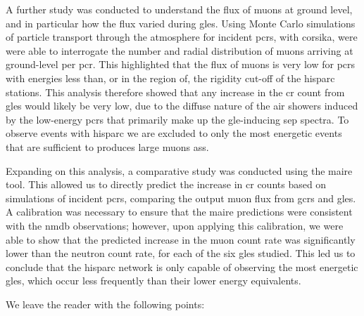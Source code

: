 A further study was conducted to understand the flux of muons at ground level, and in particular how the flux varied during \glspl{gle}. Using Monte Carlo simulations of particle transport through the atmosphere for incident \glspl{pcr}, with \gls{corsika}, were were able to interrogate the number and radial distribution of muons arriving at ground-level per \gls{pcr}. This highlighted that the flux of muons is very low for \glspl{pcr} with energies less than, or in the region of, the rigidity cut-off of the \gls{hisparc} stations. This analysis therefore showed that any increase in the \gls{cr} count from \glspl{gle} would likely be very low, due to the diffuse nature of the air showers induced by the low-energy \glspl{pcr} that primarily make up the \gls{gle}-inducing \gls{sep} spectra. To observe events with \gls{hisparc} we are excluded to only the most energetic events that are sufficient to produces large muons \glspl{as}.

Expanding on this analysis, a comparative study was conducted using the \gls{maire} tool. This allowed us to directly predict the increase in \gls{cr} counts based on simulations of incident \glspl{pcr}, comparing the output muon flux from \glspl{gcr} and \glspl{gle}. A calibration was necessary to ensure that the \gls{maire} predictions were consistent with the \gls{nmdb} observations; however, upon applying this calibration, we were able to show that the predicted increase in the muon count rate was significantly lower than the neutron count rate, for each of the six \glspl{gle} studied. This led us to conclude that the \gls{hisparc} network is only capable of observing the most energetic \glspl{gle}, which occur less frequently than their lower energy equivalents.

We leave the reader with the following points:

